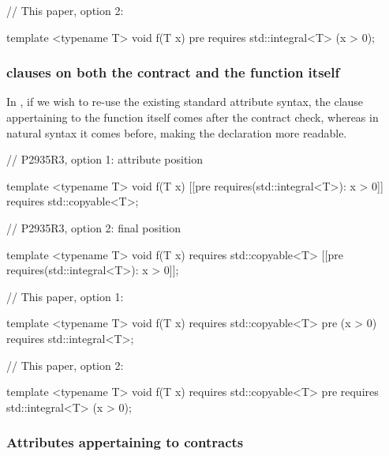 \begin{minipage}[t]{8.7cm}
\phantom{x}
\end{minipage}
\begin{minipage}[t]{8cm}
\begin{codeblock}
// This paper, option 2:

template <typename T>
void f(T x)
  pre requires std::integral<T> (x > 0);
\end{codeblock}
\end{minipage}


\subsubsection{ clauses on both the contract and the function itself}

In \cite{P2935R3}, if we wish to re-use the existing standard attribute syntax, the  clause appertaining to the function itself comes after the contract check, whereas in natural syntax it comes before, making the declaration more readable.

\begin{minipage}[t]{8.7cm}
\begin{codeblock}
// P2935R3, option 1: attribute position

template <typename T>
void f(T x)
  [[pre requires(std::integral<T>): x > 0]]
  requires std::copyable<T>;
    
// P2935R3, option 2: final position

template <typename T>
void f(T x)
  requires std::copyable<T>
  [[pre requires(std::integral<T>): x > 0]];
\end{codeblock}
\end{minipage}
\begin{minipage}[t]{8cm}
\begin{codeblock}
// This paper, option 1:

template <typename T>
void f(T x)
  requires std::copyable<T>
  pre (x > 0) requires std::integral<T>;
    
// This paper, option 2:

template <typename T>
void f(T x)
  requires std::copyable<T>
  pre requires std::integral<T> (x > 0);
\end{codeblock}
\end{minipage}

\subsubsection{Attributes appertaining to contracts}

